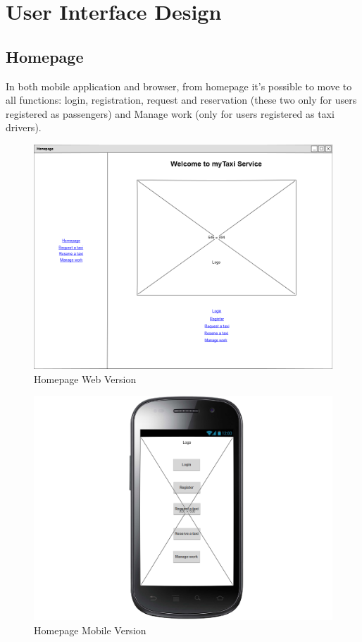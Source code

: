 \newpage
\section{User Interface Design}
\subsection{Homepage}
In both mobile application and browser, from homepage it's possible to move to all functions: login, registration, request and reservation (these two only for users registered as passengers) and Manage work (only for users registered as taxi drivers).
\begin{figure}[H]
\centering
\includegraphics[scale=0.3]{mockups/homepage_web.png}
\caption{Homepage Web Version}
\end{figure}
\begin{figure}[H]
\centering
\includegraphics[scale=0.3]{mockups/homepage_mobile.png}
\caption{Homepage Mobile Version}
\end{figure}
\break
